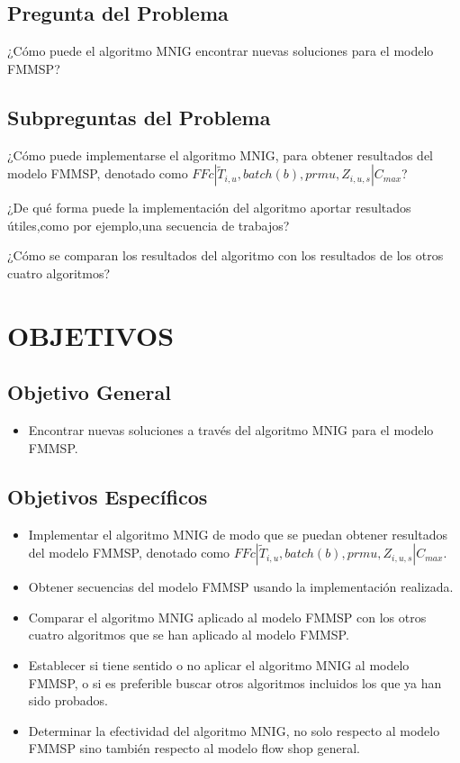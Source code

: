 \documentclass{article}
\def\notac_modelo{$FFc | \tilde{T}_{i, u}, batch(b), prmu, Z_{i, u, s} | C_{max}$}
\begin{document}
\subsection{Pregunta del Problema}

¿Cómo puede el algoritmo MNIG encontrar nuevas soluciones para el modelo FMMSP?

\subsection{Subpreguntas del Problema}

\indent\indent
¿Cómo puede implementarse el algoritmo MNIG, para obtener resultados del modelo FMMSP, denotado como \notac_modelo?

¿De qué forma puede la implementación del algoritmo aportar resultados útiles,como por ejemplo,una secuencia de trabajos?

¿Cómo se comparan los resultados del algoritmo con los resultados de los otros cuatro algoritmos?

\section{OBJETIVOS}

\subsection{Objetivo General}

\begin{itemize}
    \item Encontrar nuevas soluciones a través del algoritmo MNIG para el modelo FMMSP.
\end{itemize}

\subsection{Objetivos Específicos}

\begin{itemize}
    \item Implementar el algoritmo MNIG de modo que se puedan obtener \linebreak resultados del modelo FMMSP, denotado como \linebreak \notac_modelo.
    \item Obtener secuencias del modelo FMMSP usando la implementación realizada.
    \item Comparar el algoritmo MNIG aplicado al modelo FMMSP con los otros cuatro algoritmos que se han aplicado al modelo FMMSP.
    \item Establecer si tiene sentido o no aplicar el algoritmo MNIG al modelo FMMSP, o si es preferible buscar otros algoritmos incluidos los que ya han sido probados.
    \item Determinar la efectividad del algoritmo MNIG, no solo respecto al modelo FMMSP sino también respecto al modelo flow shop general.
\end{itemize}
\end{document}
